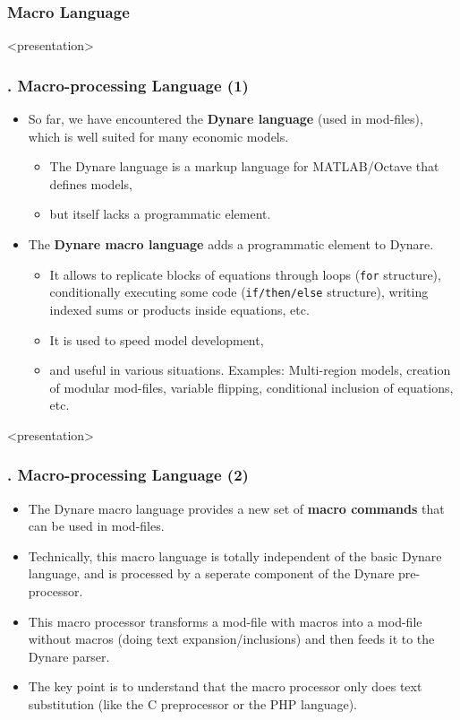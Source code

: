 \documentclass[11pt,aspectratio=169]{beamer}
\begin{document}
\subsubsection{Macro Language}
\begin{frame}<presentation>
	\frametitle{{\thesection.\thesubsection\thinspace\thesubsubsection} Macro-processing Language (1)}
	\begin{itemize}
		\item So far, we have encountered the \textbf{Dynare language} (used in mod-files), which is well suited for many economic models. 
		\begin{itemize}
			\item The Dynare language is a markup language for MATLAB/Octave that defines models,
			\item but itself lacks a programmatic element.
		\end{itemize}
		\item The \textbf{Dynare macro language} adds a programmatic element to Dynare.
		\begin{itemize}
			\item It allows to replicate blocks of equations through loops (\texttt{for} structure), conditionally executing some code (\texttt{if/then/else} structure), writing indexed sums or products inside equations, etc.
			\item It is used to speed model development,
			\item and useful in various situations. Examples: Multi-region models, creation of modular mod-files, variable flipping, conditional inclusion of equations, etc.
		\end{itemize}
	\end{itemize}
\end{frame}
\begin{frame}<presentation>
	\frametitle{{\thesection.\thesubsection\thinspace\thesubsubsection} Macro-processing Language (2)}
	\begin{itemize}
		\item The Dynare macro language provides a new set of \textbf{macro commands} that can be used in mod-files.
		\item Technically, this macro language is totally independent of the basic Dynare language, and is processed by a seperate component of the Dynare pre-processor.
		\item This macro processor transforms a mod-file with macros into a mod-file without macros (doing text expansion/inclusions) and then feeds it to the Dynare parser.
		\item The key point is to understand that the macro processor only does text substitution (like the C preprocessor or the PHP language).
	\end{itemize}
\end{frame}
\end{document}
